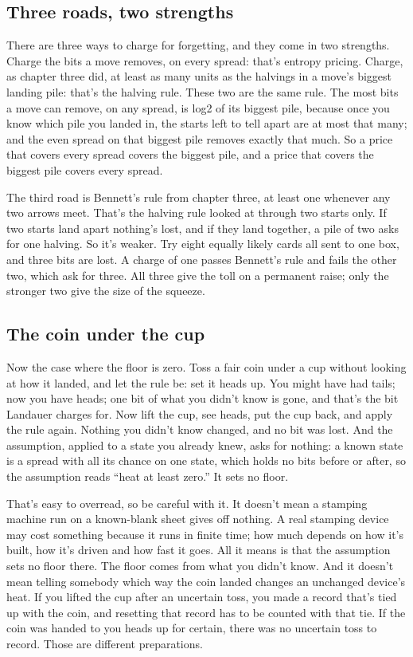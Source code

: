 \documentclass[11pt,twoside]{article}
\theoremstyle{thielethm}
\theoremstyle{thieledef}
\theoremstyle{thieledef}
\theoremstyle{thieledef}
\theoremstyle{thielethm}
\theoremstyle{thieleobs}
\theoremstyle{thielethm}
\begin{document}
\subsection{Three roads, two strengths}

There are three ways to charge for forgetting, and they come in two strengths. Charge the bits a move removes, on every spread: that's entropy pricing. Charge, as chapter three did, at least as many units as the halvings in a move's biggest landing pile: that's the halving rule. These two are the same rule. The most bits a move can remove, on any spread, is log2 of its biggest pile, because once you know which pile you landed in, the starts left to tell apart are at most that many; and the even spread on that biggest pile removes exactly that much. So a price that covers every spread covers the biggest pile, and a price that covers the biggest pile covers every spread.

The third road is Bennett's rule from chapter three, at least one whenever any two arrows meet. That's the halving rule looked at through two starts only. If two starts land apart nothing's lost, and if they land together, a pile of two asks for one halving. So it's weaker. Try eight equally likely cards all sent to one box, and three bits are lost. A charge of one passes Bennett's rule and fails the other two, which ask for three. All three give the toll on a permanent raise; only the stronger two give the size of the squeeze.

\subsection{The coin under the cup}

Now the case where the floor is zero. Toss a fair coin under a cup without looking at how it landed, and let the rule be: set it heads up. You might have had tails; now you have heads; one bit of what you didn't know is gone, and that's the bit Landauer charges for. Now lift the cup, see heads, put the cup back, and apply the rule again. Nothing you didn't know changed, and no bit was lost. And the assumption, applied to a state you already knew, asks for nothing: a known state is a spread with all its chance on one state, which holds no bits before or after, so the assumption reads ``heat at least zero.'' It sets no floor.

That's easy to overread, so be careful with it. It doesn't mean a stamping machine run on a known-blank sheet gives off nothing. A real stamping device may cost something because it runs in finite time; how much depends on how it's built, how it's driven and how fast it goes. All it means is that the assumption sets no floor there. The floor comes from what you didn't know. And it doesn't mean telling somebody which way the coin landed changes an unchanged device's heat. If you lifted the cup after an uncertain toss, you made a record that's tied up with the coin, and resetting that record has to be counted with that tie. If the coin was handed to you heads up for certain, there was no uncertain toss to record. Those are different preparations.
\end{document}
